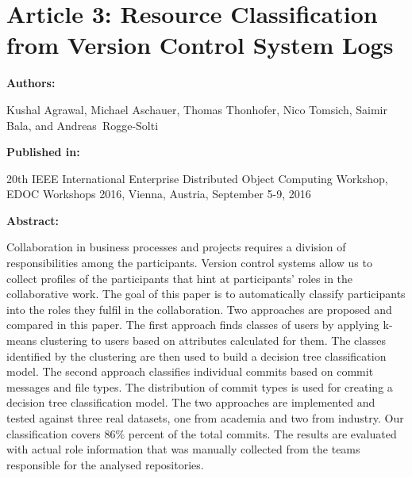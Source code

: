 \chapter{Article 3: Resource Classification from Version Control System Logs}
\label{chap:resource-classfication}

{\bfseries \Large Authors: \medskip}

\noindent Kushal Agrawal,
Michael Aschauer,
Thomas Thonhofer,
Nico Tomsich, 
Saimir Bala, and 
Andreas~Rogge-Solti \hfill

\bigskip

{\noindent\bfseries \Large Published in: \medskip}

\noindent 20th {IEEE} International Enterprise Distributed Object Computing
Workshop, {EDOC} Workshops 2016, Vienna, Austria, September 5-9, 2016

\bigskip

{\noindent\bfseries \Large Abstract: \medskip}


\noindent Collaboration in business processes and projects requires a division of responsibilities among the participants. Version control systems allow us to collect profiles of the participants that hint at participants' roles in the collaborative work. The goal of this paper is to automatically classify participants into the roles they fulfil in the collaboration. Two approaches are proposed and compared in this paper. The first approach finds classes of users by applying k-means clustering to users based on attributes calculated for them. The classes identified by the clustering are then used to build a decision tree classification model. The second approach classifies individual commits based on commit messages and file types. The distribution of commit types is used for creating a decision tree classification model. The two approaches are implemented and tested against three real datasets, one from academia and two from industry. Our classification covers 86\% percent of the total commits. The results are evaluated with actual role information that was manually collected from the teams responsible for the analysed repositories.

\pagebreak









